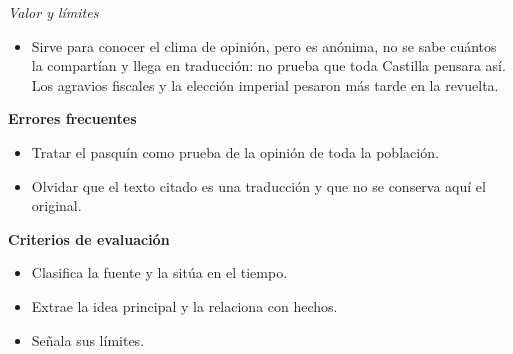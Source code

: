 \documentclass{book}
\begin{document}
\begin{tcolorbox}[title={Ejercicio resuelto}, studiumworked, breakable]
\noindent\textit{Valor y límites}
\begin{itemize}
\item Sirve para conocer el clima de opinión, pero es anónima, no se sabe cuántos la compartían y llega en traducción: no prueba que toda Castilla pensara así. Los agravios fiscales y la elección imperial pesaron más tarde en la revuelta.
\end{itemize}

\noindent\textbf{Errores frecuentes}
\begin{itemize}
\item Tratar el pasquín como prueba de la opinión de toda la población.
\item Olvidar que el texto citado es una traducción y que no se conserva aquí el original.
\end{itemize}

\noindent\textbf{Criterios de evaluación}
\begin{itemize}
\item Clasifica la fuente y la sitúa en el tiempo.
\item Extrae la idea principal y la relaciona con hechos.
\item Señala sus límites.
\end{itemize}
\end{tcolorbox}
\end{document}
